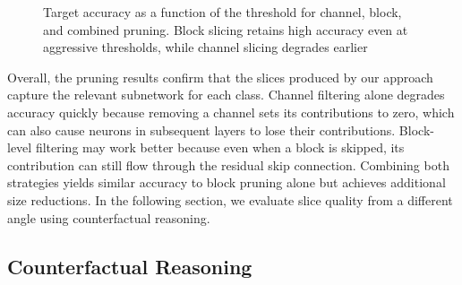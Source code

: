 \documentclass[
12pt,
fancyheadings,
a4paper,
twoside,
BCOR=0.7cm,
nobcorignoretitle,
grayscalebody,
]{stsreprt}
\begin{document}
\begin{figure}[ht]
\centering
{}
\caption{Target accuracy as a function of the threshold for channel, block, and combined pruning. Block slicing retains high accuracy even at aggressive thresholds, while channel slicing degrades earlier}
\label{fig:pruning_tradeoff}
\end{figure}

Overall, the pruning results confirm that the slices produced by our approach capture the relevant
subnetwork for each class.
Channel filtering alone degrades accuracy quickly because removing a channel sets its contributions
to zero, which can also cause neurons in subsequent layers to lose their contributions.
Block-level filtering may work better because even when a block is skipped, its contribution can
still flow through the residual skip connection.
Combining both strategies yields similar accuracy to block pruning alone but achieves additional
size reductions.
In the following section, we evaluate slice quality from a different angle using counterfactual
reasoning.

\subsection*{Counterfactual Reasoning}
\end{document}

